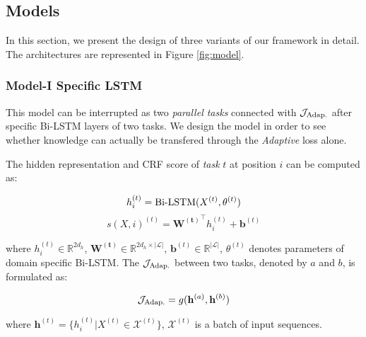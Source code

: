 \subsection{Models}\label{sec:models}


In this section, we present the design of three variants of our framework in detail. The architectures are represented in Figure \ref{fig:model}.

\subsubsection{Model-\RN{1} Specific LSTM}

This model can be interrupted as two \textit{parallel tasks} connected with $\mathcal{J}_{\textnormal{Adap.}}$ after specific Bi-LSTM layers of two tasks. We design the model in order to see whether knowledge can actually be transfered through the \textit{Adaptive} loss alone.

The hidden representation and CRF score of \textit{task} $t$ at position $i$ can be computed as:

\small
\begin{equation}\label{eq:model_1_h}
h_i^{(t)} = \textnormal{Bi-LSTM}(X^{(t)}, \theta^{(t)})
\end{equation}
\begin{equation}\label{eq:model_1_s}
s(X, i)^{(t)} = \mathbf{W^{(t)}}^\top h_i^{(t)} + \mathbf{b}^{(t)}
\end{equation}
\normalsize

\noindent where $h_i^{(t)} \in \mathbb{R}^{2d_h}$, $\mathbf{W^{(t)}} \in \mathbb{R}^{2d_h \times |\mathcal{L}|}$, $\mathbf{b}^{(t)} \in \mathbb{R}^{|\mathcal{L}|}$, $\theta^{(t)}$ denotes parameters of domain specific Bi-LSTM. The $\mathcal{J}_{\textnormal{Adap.}}$ between two tasks, denoted by $a$ and $b$, is formulated as:

\small
\begin{equation}\label{eq:model_1_adap}
\mathcal{J}_{\textnormal{Adap.}} = g(\mathbf{h}^{(a)}, \mathbf{h}^{(b)})
\end{equation}
\normalsize

\noindent where $\mathbf{h}^{(t)} = \{h_i^{(t)} | X^{(t)} \in \mathcal{X}^{(t)}\}$, $\mathcal{X}^{(t)}$ is a batch of input sequences.

